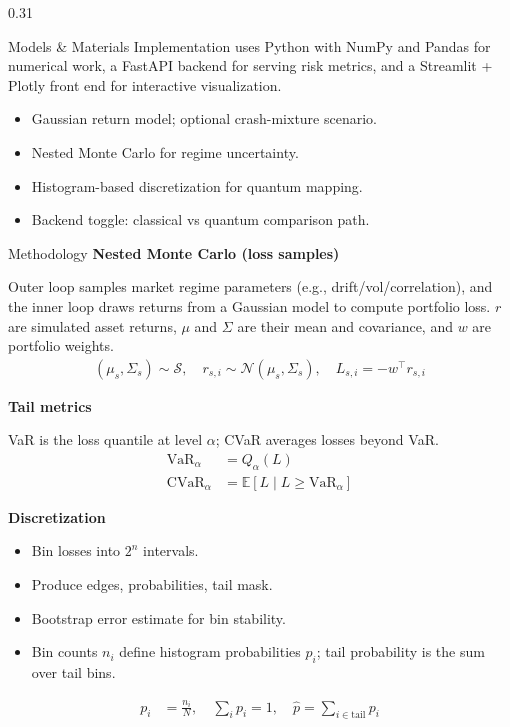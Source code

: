 \documentclass[final]{beamer}
\begin{document}
\begin{frame}[t]
\begin{columns}[t,totalwidth=\linewidth]
\begin{column}{0.31\linewidth}
\begin{block}{Models \& Materials}
Implementation uses Python with NumPy and Pandas for numerical work, a FastAPI backend for serving risk metrics, and a Streamlit + Plotly front end for interactive visualization.
\begin{itemize}
    \item Gaussian return model; optional crash-mixture scenario.
    \item Nested Monte Carlo for regime uncertainty.
    \item Histogram-based discretization for quantum mapping.
    \item Backend toggle: classical vs quantum comparison path.
\end{itemize}
\end{block}

\begin{block}{Methodology}
\textbf{\large Nested Monte Carlo (loss samples)}

Outer loop samples market regime parameters (e.g., drift/vol/correlation), and the inner loop draws returns from a Gaussian model to compute portfolio loss. $r$ are simulated asset returns, $\mu$ and $\Sigma$ are their mean and covariance, and $w$ are portfolio weights.
\begin{align*}
(\mu_s,\Sigma_s) \sim \mathcal{S}, \quad r_{s,i} \sim \mathcal{N}(\mu_s,\Sigma_s), \quad L_{s,i} = -w^\top r_{s,i}
\end{align*}

\textbf{\large Tail metrics}

VaR is the loss quantile at level $\alpha$; CVaR averages losses beyond VaR.
\begin{align*}
    \text{VaR}_{\alpha} &= Q_{\alpha}(L) \\
    \text{CVaR}_{\alpha} &= \mathbb{E}[L \mid L \ge \text{VaR}_{\alpha}]
\end{align*}

\textbf{\large Discretization}
\begin{itemize}
    \item Bin losses into $2^n$ intervals.
    \item Produce edges, probabilities, tail mask.
    \item Bootstrap error estimate for bin stability.
    \item Bin counts $n_i$ define histogram probabilities $p_i$; tail probability is the sum over tail bins.
\end{itemize}
\begin{align*}
    p_i &= \frac{n_i}{N}, \quad \sum_i p_i = 1, \quad \hat{p} = \sum_{i \in \text{tail}} p_i
\end{align*}


\end{block}
\end{column}
\end{columns}
\end{frame}
\end{document}
